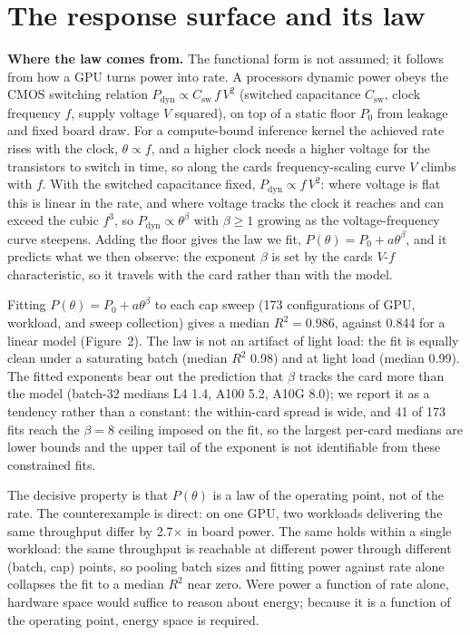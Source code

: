 \section{The response surface and its law}\label{the-response-surface-and-its-law}

\textbf{Where the law comes from.} The functional form is not assumed; it follows from how a GPU turns power
into rate. A processor\textquotesingle s dynamic power obeys the CMOS switching relation
{\(P_{\mathrm{dyn}}\propto C_{\mathrm{sw}}\,f\,V^2\)} (switched capacitance
{\(C_{\mathrm{sw}}\)}, clock frequency {\(f\)}, supply voltage {\(V\)} squared),
on top of a static floor {\(P_0\)} from leakage and fixed board draw. For a compute-bound
inference kernel the achieved rate rises with the clock, {\(\theta\propto f\)}, and a higher clock
needs a higher voltage for the transistors to switch in time, so along the card\textquotesingle s frequency-scaling curve {\(V\)} climbs
with {\(f\)}. With the switched capacitance fixed, {\(P_{\mathrm{dyn}}\propto f\,V^2\)}: where
voltage is flat this is linear in the rate, and where voltage tracks the clock it reaches and can exceed the
cubic {\(f^3\)}, so {\(P_{\mathrm{dyn}}\propto \theta^{\beta}\)} with
{\(\beta\ge 1\)} growing as the voltage-frequency curve steepens. Adding the floor gives the law
we fit, {\(P(\theta)=P_0+a\theta^{\beta}\)}, and it predicts what we then observe: the exponent
{\(\beta\)} is set by the card\textquotesingle s {\(V\)}-{\(f\)} characteristic, so it
travels with the card rather than with the model.

Fitting {\(P(\theta)=P_0+a\theta^\beta\)} to each
cap sweep (173 configurations of GPU, workload, and sweep collection) gives a median
{\(R^2=0.986\)}, against 0.844 for a linear model (Figure~2). The law is
not an artifact of light load: the fit is equally clean under a saturating batch (median
{\(R^2\)} 0.98) and at light load (median 0.99). The fitted exponents bear out the prediction that {\(\beta\)} tracks the card
more than the model
(batch-32 medians L4 1.4, A100 5.2,
A10G 8.0); we report it as a tendency rather than a constant: the within-card
spread is wide, and 41 of 173 fits reach the {\(\beta=8\)} ceiling imposed
on the fit, so the largest per-card medians are lower bounds and the upper tail of the exponent is not identifiable from these constrained fits.

The decisive property is that {\(P(\theta)\)} is a law of the operating point, not of the rate.
The counterexample is direct: on one GPU, two workloads delivering the same throughput
differ by 2.7$\times$ in board power. The same holds within a single workload: the same
throughput is reachable at different power
through different (batch, cap) points, so pooling batch sizes and fitting power against rate alone collapses
the fit to a median {\(R^2\)} near zero. Were power a function of rate alone, hardware space would suffice to
reason about energy; because it is a function of the operating point, energy space is required.

